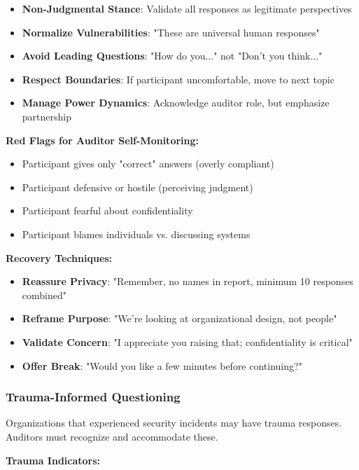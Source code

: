 \documentclass[11pt,a4paper]{article}
\begin{document}
\begin{itemize}
\item \textbf{Non-Judgmental Stance}: Validate all responses as legitimate perspectives
\item \textbf{Normalize Vulnerabilities}: "These are universal human responses"
\item \textbf{Avoid Leading Questions}: "How do you..." not "Don't you think..."
\item \textbf{Respect Boundaries}: If participant uncomfortable, move to next topic
\item \textbf{Manage Power Dynamics}: Acknowledge auditor role, but emphasize partnership
\end{itemize}

\textbf{Red Flags for Auditor Self-Monitoring:}

\begin{itemize}
\item Participant gives only "correct" answers (overly compliant)
\item Participant defensive or hostile (perceiving judgment)
\item Participant fearful about confidentiality
\item Participant blames individuals vs. discussing systems
\end{itemize}

\textbf{Recovery Techniques:}

\begin{itemize}
\item \textbf{Reassure Privacy}: "Remember, no names in report, minimum 10 responses combined"
\item \textbf{Reframe Purpose}: "We're looking at organizational design, not people"
\item \textbf{Validate Concern}: "I appreciate you raising that; confidentiality is critical"
\item \textbf{Offer Break}: "Would you like a few minutes before continuing?"
\end{itemize}

\subsubsection{Trauma-Informed Questioning}

Organizations that experienced security incidents may have trauma responses. Auditors must recognize and accommodate these.

\textbf{Trauma Indicators:}
\end{document}
